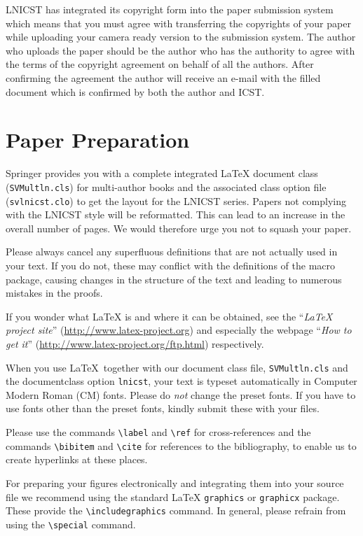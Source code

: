 \documentclass[lnicst,sechang,a4paper]{svmultln}
\begin{document}
LNICST has integrated its copyright form into the paper submission system
which means that you must agree with transferring the copyrights of your
paper while uploading your camera ready version to the submission system.
The author who uploads the paper should be the author who has the authority
to agree with the terms of the copyright agreement on behalf of all the
authors. After confirming the agreement the author will receive an e-mail
with the filled document which is confirmed by both the author and ICST.

\section{Paper Preparation}

Springer
provides you with a complete integrated \LaTeX{} document class (\texttt{SVMultln.cls})
for multi-author books and the associated class option file (\texttt{svlnicst.clo})
to get the layout for the LNICST series.
Papers not complying with the LNICST style will be reformatted. This can
lead to an increase in the overall number of pages. We would therefore
urge you not to squash your paper.

Please always cancel any superfluous definitions that are
not actually used in your text. If you do not, these may conflict with
the definitions of the macro package, causing changes in the structure
of the text and leading to numerous mistakes in the proofs.

If you wonder what \LaTeX{} is and where it can be obtained, see the
``\textit{LaTeX project site}'' (\url{http://www.latex-project.org})
and especially the webpage ``\textit{How to get it}''
(\url{http://www.latex-project.org/ftp.html}) respectively.

When you use \LaTeX\ together with our document class file,
\texttt{SVMultln.cls} and the documentclass option \texttt{lnicst},
your text is typeset automatically in Computer Modern Roman (CM) fonts.
Please do
\emph{not} change the preset fonts. If you have to use fonts other
than the preset fonts, kindly submit these with your files.

Please use the commands \verb+\label+ and \verb+\ref+ for
cross-references and the commands \verb+\bibitem+ and \verb+\cite+ for
references to the bibliography, to enable us to create hyperlinks at
these places.

For preparing your figures electronically and integrating them into
your source file we recommend using the standard \LaTeX{} \verb+graphics+ or
\verb+graphicx+ package. These provide the \verb+\includegraphics+ command.
In general, please refrain from using the \verb+\special+ command.
\end{document}
